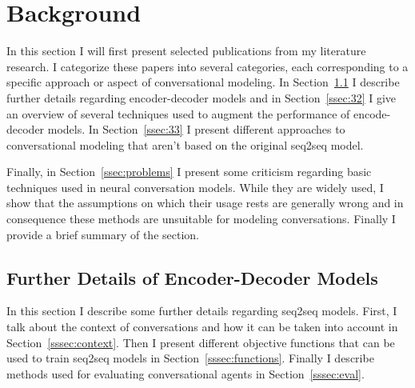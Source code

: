 \documentclass[12pt]{article}
\begin{document}
\newpage\section{Background} \label{sec:background}
In this section I will first present selected publications from my literature research. I categorize these papers into several categories, each corresponding to a specific approach or aspect of conversational modeling. In Section~\ref{ssec:31} I describe further details regarding encoder-decoder models and in Section~\ref{ssec:32} I give an overview of several techniques used to augment the performance of encode-decoder models. In Section~\ref{ssec:33} I present different approaches to conversational modeling that aren't based on the original seq2seq model.

Finally, in Section~\ref{ssec:problems} I present some criticism regarding basic techniques used in neural conversation models. While they are widely used, I show that the assumptions on which their usage rests are generally wrong and  in consequence these methods are unsuitable for modeling conversations. Finally I provide a brief summary of the section.

\subsection{Further Details of Encoder-Decoder Models} \label{ssec:31}
In this section I describe some further details regarding seq2seq models. First, I talk about the context of conversations and how it can be taken into account in Section~\ref{sssec:context}. Then I present different objective functions that can be used to train seq2seq models in Section~\ref{sssec:functions}. Finally I describe methods used for evaluating conversational agents in Section~\ref{sssec:eval}.
\end{document}
